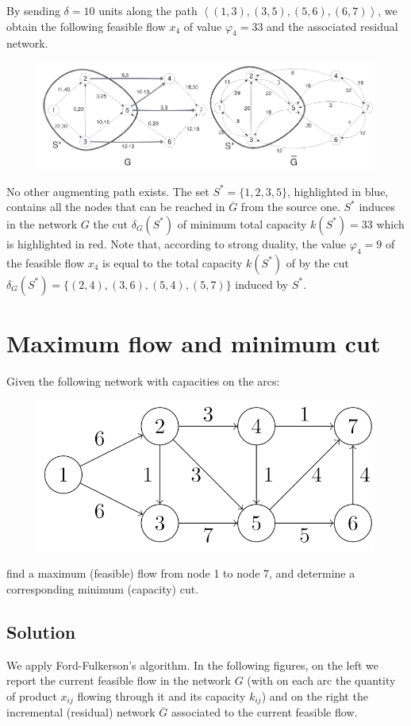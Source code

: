 \documentclass[12pt, a4paper]{report}
\newtheorem[style=M,bodystyle=\normalfont]{theorem}{Theorem}
\newtheorem[style=M,bodystyle=\normalfont]{corollary}{Corollary}
\newtheorem[style=M,bodystyle=\normalfont]{lemma}{Lemma}
\newtheorem[style=M,bodystyle=\normalfont]{definition}{Definition}
\begin{document}
        By sending $\delta = 10$ units along the path $\left\langle (1, 3),(3, 5),(5, 6),(6, 7)\right\rangle $, we obtain the following feasible flow $x_4$ of value $\varphi_4 = 33$ 
        and the associated residual network. 
        \begin{figure}[H]
            \centering
            \includegraphics[width=1\linewidth]{images/flow2.png}
        \end{figure}
        No other augmenting path exists. The set $S^{*} = \{1, 2, 3, 5\}$, highlighted in blue, contains all the nodes that can be reached in $\overline{G}$ from the 
        source one. $S^{*}$ induces in the network $G$ the cut $\delta_G(S^{*})$ of minimum total capacity $k(S^{*})=33$ which is highlighted in red. Note that, 
        according to strong duality, the value $\varphi_4 = 9$ of the feasible flow $x_4$ is equal to the total capacity $k(S^{*})$ of by the cut 
        $\delta_G(S^{*}) = \{(2, 4),(3, 6),(5, 4),(5, 7)\}$ induced by $S^{*}$.
        
    \newpage 

    \section{Maximum flow and minimum cut}
        Given the following network with capacities on the arcs: 
        \begin{figure}[H]
            \centering
            \includegraphics[width=0.5\linewidth]{images/maxcut.png}
        \end{figure}
        find a maximum (feasible) flow from node 1 to node 7, and determine a corresponding minimum (capacity) cut.
    \subsection*{Solution}
        We apply Ford-Fulkerson's algorithm. In the following figures, on the left we report the current feasible flow in the network $G$ (with on each arc the quantity 
        of product $x_{ij}$ flowing through it and its capacity $k_{ij}$) and on the right the incremental (residual) network $\overline{G}$ associated to the current 
        feasible flow.
\end{document}
